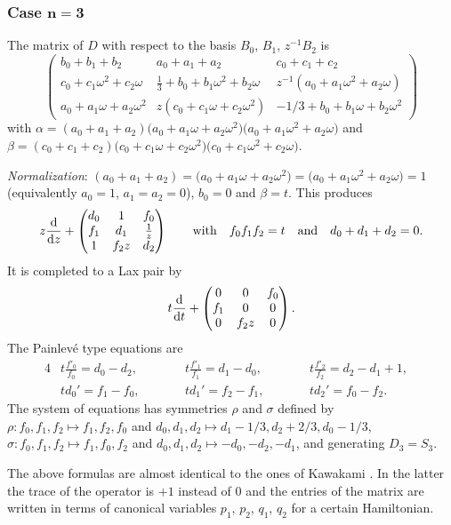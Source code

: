 \documentclass[pdftex]{sigma}
\numberwithin{equation}{section}
\begin{document}
\subsubsection[Case n=3]{Case $\boldsymbol{n=3}$}
The matrix of $D$ with respect to the basis $B_0$, $B_1$, $z^{-1}B_2$ is
\[\begin{pmatrix} b_0+b_1+b_2 & a_0+a_1+a_2 & c_0+c_1+c_2 \\
 c_0+c_1\omega ^2 +c_2\omega &\frac{1}{3}+b_0+b_1\omega^2+b_2\omega
 & z^{-1}(a_0+a_1\omega^2+a_2\omega ) \\
a_0+a_1\omega+a_2\omega^2 & z(c_0+c_1\omega+c_2\omega ^2)& -1/3+b_0+b_1\omega +b_2\omega^2
\end{pmatrix} \]
with $\alpha =(a_0+a_1+a_2)\bigl(a_0+a_1\omega +a_2\omega ^2\bigr)\bigl(a_0+a_1\omega^2+a_2\omega\bigr)$ and
 $\beta=(c_0+c_1+c_2)\bigl(c_0+c_1\omega +c_2\omega ^2\bigr)\bigl(c_0+c_1\omega^2+c_2\omega\bigr)$.

 {\it Normalization}: $(a_0+a_1+a_2)=\bigl(a_0+a_1\omega +a_2\omega ^2\bigr)=\bigl(a_0+a_1\omega^2+a_2\omega\bigr)=1$ (equivalently $a_0=1$, $a_1=a_2=0$), $b_0=0$ and $\beta=t$.
This produces
\[z\frac{{\rm d}}{{\rm d}z}+\begin{pmatrix}d_0 &1& f_0\\ f_1&d_1 & \frac{1}{z}\\ 1 &f_2z &d_2\end{pmatrix} \qquad\text{with}\quad f_0f_1f_2=t\quad\text{and}\quad d_0+d_1+d_2=0.\]
 It is completed to a Lax pair by
\[
t\frac{{\rm d}}{{\rm d}t}+\begin{pmatrix}0 &0& f_0\\ f_1&0 &0 \\ 0 & f_2z&0 \end{pmatrix}.
\]
The Painlev\'e type equations are
\begin{alignat*}{4}
& t\frac{f'_0}{f_0}= d_0-d_2 ,\qquad&&  t\frac{f'_1}{f_1}=d_1-d_0 ,\qquad && t\frac{f'_2}{f_2}=d_2-d_1+1 ,& \\
& td_0'=f_1-f_0,\qquad && td_1'=f_2-f_1,\qquad && td_2'=f_0-f_2.&
\end{alignat*}
 The system of equations has symmetries $\rho$ and $\sigma$ defined by
$\rho\colon f_0,f_1,f_2 \mapsto f_1,f_2,f_0$ and $d_0,d_1,d_2 \mapsto d_1-1/3, d_2+2/3, d_0-1/3$,
$\sigma\colon f_0,f_1,f_2\mapsto f_1,f_0,f_2$ and $d_0,d_1,d_2 \mapsto -d_0,-d_2,-d_1$,
and generating $D_3=S_3$.

The above formulas are almost identical to the ones of Kawakami \cite[p.\ 35]{K3}. In the latter the
trace of the operator is $+1$ instead of $0$ and the entries of the matrix are written in terms of canonical variables
$p_1$, $p_2$, $q_1$, $q_2$ for a certain Hamiltonian.
\end{document}
